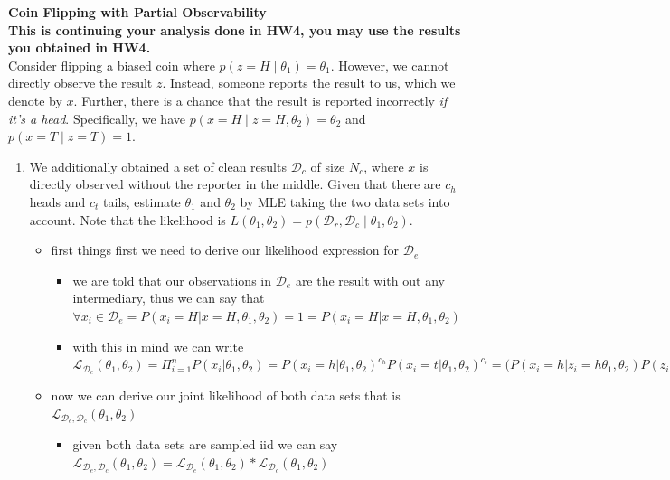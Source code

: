 \documentclass{article}
\newcommand{\nyuparagraph}[1]{\vspace{0.3cm}\textcolor{nyupurple}{\bf \large #1}\\}
\theoremstyle{plain}
\theoremstyle{definition}
\begin{document}
\nyuparagraph{Coin Flipping with Partial Observability}
\textbf{This is continuing your analysis done in HW4, you may use the results you obtained in HW4.}\\
Consider flipping a biased coin where $p(z=H\mid \theta_1) = \theta_1$.
However, we cannot directly observe the result $z$.
Instead, someone reports the result to us,
which we denote by $x$.
Further, there is a chance that the result is reported incorrectly \emph{if it's a head}.
Specifically, we have $p(x=H\mid z=H, \theta_2) = \theta_2$
and $p(x=T\mid z=T) = 1$.
\begin{enumerate}
  \setcounter{enumi}{\value{saveenum}}
\item We additionally obtained a set of clean results $\mathcal{D}_c$ of size $N_c$, where $x$ is directly observed without the reporter in the middle. Given that there are $c_h$ heads and $c_t$ tails,
estimate $\theta_1$ and $\theta_2$ by MLE taking the two data sets into account.
Note that the likelihood is $L(\theta_1, \theta_2) = p(\mathcal{D}_r, \mathcal{D}_c\mid \theta_1, \theta_2)$.
\begin{itemize}
    \color{blue}
    \item first things first we need to derive our likelihood expression for $\mathcal{D}_{e}$
    \begin{itemize}
        \item we are told that our observations in $\mathcal{D}_{e}$ are the result with out any intermediary, thus we can say that $\forall x_i\in \mathcal{D}_{e}=P(x_i=H|x=H, \theta_1, \theta_2)=1=P(x_i=H|x=H, \theta_1, \theta_2)$ 
        \item with this in mind we can write $\mathcal{L}_{\mathcal{D}_{e}}(\theta_1,\theta_2)=\Pi_{i=1}^{n}P(x_i|\theta_1,\theta_2)=P(x_i=h|\theta_1,\theta_2)^{c_h}P(x_i=t|\theta_1,\theta_2)^{c_t}=(P(x_i=h|z_i=h\theta_1,\theta_2)P(z_i=h|\theta_1,\theta_2)+P(x_i=h|z_i=T,\theta_1,\theta_2)P(z_i=T|\theta_1,\theta_2)^{c_h}( P(x_i=t|,z_i=h,\theta_1,\theta_2)P(z_i=h|\theta_1,\theta_2)+P(x_i=t|,z_i=t,\theta_1,\theta_2)P(z_i=t|\theta_1,\theta_2)  )^{c_t}=P(z_i=H|\theta_1,\theta_2)^{c_h}P(z_i=T|\theta_1,\theta_2)^{c_t}=P(z_i=H|\theta_1)^{c_h}P(z_i=T|\theta_1)^{c_t}=\theta_1^{c_h}(1-\theta_1)^{c_t}$
    \end{itemize}
    \item now we can derive our joint likelihood of both data sets that is $\mathcal{L}_{\mathcal{D}_{e},\mathcal{D}_{c}}(\theta_1,\theta_2)$
    \begin{itemize}
        \item given both data sets are sampled iid we can say $\mathcal{L}_{\mathcal{D}_{e},\mathcal{D}_{c}}(\theta_1,\theta_2)=\mathcal{L}_{\mathcal{D}_{e}}(\theta_1,\theta_2)*\mathcal{L}_{\mathcal{D}_{c}}(\theta_1,\theta_2)$

\end{itemize}
\end{itemize}
\end{enumerate}
\end{document}

